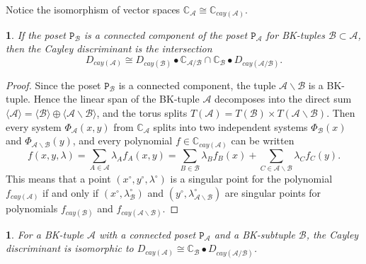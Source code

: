 \documentclass[11pt]{article}
\theoremstyle{plain}
\theoremstyle{definition}
\theoremstyle{remark}
\theoremstyle{plain}
\newtheorem{lem}[thm]{\protect\lemmaname}
\theoremstyle{plain}
\theoremstyle{plain}
\theoremstyle{definition}
\providecommand{\lemmaname}{Lemma}
\begin{document}
Notice the isomorphism of vector spaces $\mathbb{C}_{\mathscr{A}}\cong\mathbb{C}_{cay(\mathscr{A})}.$
\begin{lem}
\label{Lemma. Cayley discriminant for a connected component of the poset}If
the poset $\mathtt{P}_{\mathscr{B}}$ is a connected component of
the poset $\mathtt{P}_{\mathscr{A}}$ for BK-tuples $\mathscr{B}\subset\mathscr{A}$,
then the Cayley discriminant is the intersection
\[
D_{cay(\mathscr{A})}\cong D_{cay(\mathscr{B})}\bullet\mathbb{C}_{\mathscr{A}/\mathscr{B}}\cap\mathbb{C}_{\mathscr{B}}\bullet D_{cay(\mathscr{A}/\mathscr{B})}.
\]
\end{lem}

\begin{proof}
Since the poset $\mathtt{P}_{\mathscr{B}}$ is a connected component,
the tuple $\mathscr{A}\backslash\mathscr{B}$ is a BK-tuple. Hence
the linear span of the BK-tuple $\mathscr{A}$ decomposes into the
direct sum $\langle\mathscr{A}\rangle=\langle\mathscr{B}\rangle\oplus\langle\mathscr{A}\backslash\mathscr{B}\rangle$,
and the torus splits $T(\mathscr{A})=T(\mathscr{B})\times T(\mathscr{A}\backslash\mathscr{B}).$
Then every system $\Phi_{\mathscr{A}}(x,y)$ from $\mathbb{C}_{\mathscr{A}}$
splits into two independent systems $\Phi_{\mathscr{B}}(x)$ and $\Phi_{\mathscr{A}\backslash\mathscr{B}}(y)$,
and every polynomial $f\in\mathbb{C}_{cay(\mathscr{A})}$ can be written
\[
f(x,y,\lambda)=\underset{A\in\mathscr{A}}{\sum}\lambda_{A}f_{A}(x,y)=\underset{B\in\mathscr{B}}{\sum}\lambda_{B}f_{B}(x)+\underset{C\in\mathscr{A}\backslash\mathscr{B}}{\sum}\lambda_{C}f_{C}(y).
\]
This means that a point $(x^{\circ},y^{\circ},\lambda^{\circ})$ is
a singular point for the polynomial $f_{cay(\mathscr{A})}$ if and
only if $(x^{\circ},\lambda_{\mathscr{B}}^{\circ})$ and $(y^{\circ},\lambda_{\mathscr{\mathscr{A}\backslash B}}^{\circ})$
are singular points for polynomials $f_{cay(\mathscr{B})}$ and $f_{cay(\mathscr{A}\backslash\mathscr{B})}$. 
\end{proof}
\begin{lem}
\label{Lemma. Simplification of a Cayley discriminant}For a BK-tuple
$\mathscr{A}$ with a connected poset $\mathtt{P}_{\mathscr{A}}$
and a BK-subtuple $\mathscr{B}$, the Cayley discriminant is isomorphic
to $D_{cay(\mathscr{A})}\cong\mathbb{C}_{\mathscr{B}}\bullet D_{cay(\mathscr{A}/\mathscr{B})}$.
\end{lem}
\end{document}
